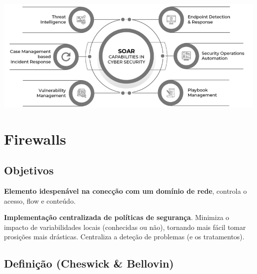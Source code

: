 \documentclass{article}
\begin{document}
\begin{center}
  \includegraphics[scale=0.4]{50}
\end{center}

\pagebreak

\section{Firewalls}

\subsection{Objetivos}

\begin{flushleft}
  \textbf{Elemento idespenável na conecção com um domínio de rede},
  controla o acesso, flow e conteúdo.

  \vspace{2mm}

  \textbf{Implementação centralizada de políticas de segurança}. Minimiza o impacto
  de variabilidades locais (conhecidas ou não), tornando mais fácil tomar prosições
  mais drásticas. Centraliza a deteção de problemas (e os tratamentos).
\end{flushleft}

\subsection{Definição (Cheswick \& Bellovin)}
\end{document}

